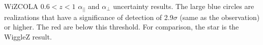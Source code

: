 \label{fig:wizcola_hdaUnc_z60_epsilonT15} WiZCOLA $0.6<z<1$ $\alpha_{||}$ and $\alpha_\perp$ uncertainty results. The large blue circles are realizations that have a significance of detection of 2.9$\sigma$ (same as the observation) or higher. The red are below this threshold. For comparison, the star is the WiggleZ result. 